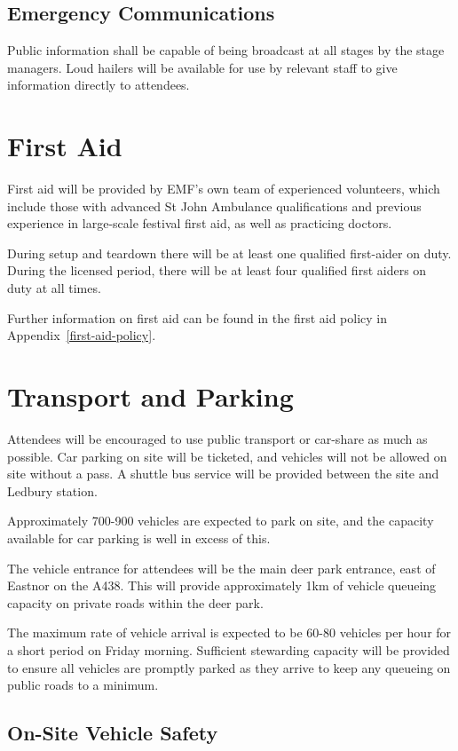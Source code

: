 \subsection{Emergency Communications}
Public information shall be capable of being broadcast at all stages by the
stage managers. Loud hailers will be available for use by relevant staff to
give information directly to attendees.

\section{First Aid}

First aid will be provided by EMF's own team of experienced volunteers,
which include those with advanced St John Ambulance qualifications and previous
experience in large-scale festival first aid, as well as practicing doctors.

During setup and teardown there will be at least one qualified first-aider on
duty. During the licensed period, there will be at least four qualified first
aiders on duty at all times.

Further information on first aid can be found in the first aid policy in
Appendix~\ref{first-aid-policy}.

\section{Transport and Parking}

Attendees will be encouraged to use public transport or car-share as much as
possible. Car parking on site will be ticketed, and vehicles will not be
allowed on site without a pass. A shuttle bus service will be provided between
the site and Ledbury station.

Approximately 700-900 vehicles are expected to park on site, and the capacity
available for car parking is well in excess of this.

The vehicle entrance for attendees will be the main deer park entrance, east of
Eastnor on the A438. This will provide approximately 1km of vehicle queueing
capacity on private roads within the deer park.

The maximum rate of vehicle arrival is expected to be 60-80 vehicles per hour
for a short period on Friday morning. Sufficient stewarding capacity will be
provided to ensure all vehicles are promptly parked as they arrive to keep any
queueing on public roads to a minimum.

\subsection{On-Site Vehicle Safety}

